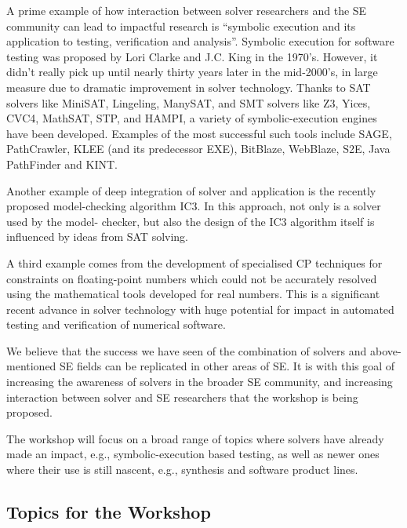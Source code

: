 \documentclass{sig-alternate}
\begin{document}
\vspace{0.2cm} A prime example of how interaction between solver
researchers and the SE community can lead to impactful research is
``symbolic execution and its application to testing, verification and
analysis''. Symbolic execution for software testing was proposed by
Lori Clarke and J.C. King in the 1970's. However, it didn't really
pick up until nearly thirty years later in the mid-2000's, in large
measure due to dramatic improvement in solver technology. Thanks to
SAT solvers like MiniSAT, Lingeling, ManySAT, and SMT solvers like Z3,
Yices, CVC4, MathSAT, STP, and HAMPI, a variety of symbolic-execution
engines have been developed. Examples of the most successful such
tools include SAGE, PathCrawler, KLEE (and its predecessor EXE),
BitBlaze, WebBlaze, S2E, Java PathFinder and KINT.

\vspace{0.2cm} Another example of deep integration of solver and
application is the recently proposed model-checking algorithm IC3.  In
this approach, not only is a solver used by the model- checker, but
also the design of the IC3 algorithm itself is influenced by ideas
from SAT solving.

\vspace{0.2cm} A third example comes from the development of
specialised CP techniques for constraints on floating-point numbers
which could not be accurately resolved using the mathematical tools
developed for real numbers. This is a significant recent advance in
solver technology with huge potential for impact in automated testing
and verification of numerical software.

\vspace{0.2cm} We believe that the success we have seen of the
combination of solvers and above-mentioned SE fields can be replicated
in other areas of SE. It is with this goal of increasing the awareness
of solvers in the broader SE community, and increasing interaction
between solver and SE researchers that the workshop is being proposed.

\vspace{0.2cm} The workshop will focus on a broad range of topics
where solvers have already made an impact, e.g., symbolic-execution
based testing, as well as newer ones where their use is still nascent,
e.g., synthesis and software product lines.

\subsection*{Topics for the Workshop}
\vspace{0.2cm}
\end{document}
